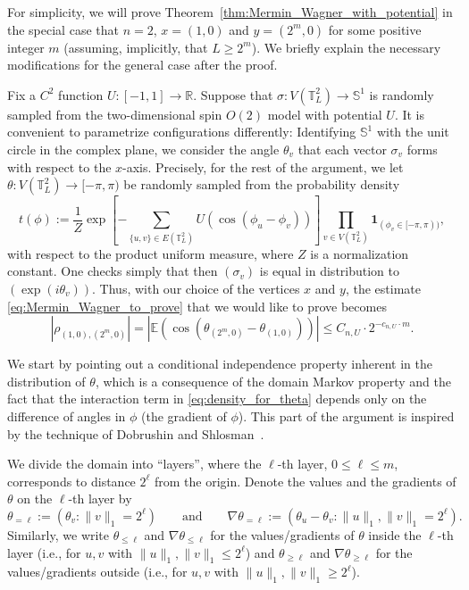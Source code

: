 \documentclass[12pt,reqno]{article}
\def\R{\mathbb{R}}
\def\E{\mathbb{E}}
\def\T{\mathbb{T}}
\def\one{\mathbf{1}}
\begin{document}
For simplicity, we will prove
Theorem~\ref{thm:Mermin_Wagner_with_potential} in the special case
that $n=2$, $x = (1,0)$ and $y = (2^m, 0)$ for some positive integer $m$
(assuming, implicitly, that $L\ge 2^m$). We briefly explain the
necessary modifications for the general case after the proof.

Fix a $C^2$ function $U:[-1,1]\to\R$.
Suppose that $\sigma:V(\T_L^2)\to \mathbb S^1$ is randomly sampled
from the two-dimensional spin $O(2)$ model with potential $U$. It is
convenient to parametrize configurations differently: Identifying
$\mathbb S^1$ with the unit circle in the complex plane, we consider
the angle $\theta_v$ that each vector $\sigma_v$ forms with respect
to the $x$-axis. Precisely, for the rest of the argument, we let
$\theta:V(\T_L^2)\to[-\pi,\pi)$ be randomly sampled from the
probability density
\begin{equation}\label{eq:density_for_theta}
  t(\phi) := \frac{1}{Z}\exp \left[-\sum_{\{u,v\}\in
E(\T_L^2)}U(\cos(\phi_u - \phi_v))\right]
  \prod_{v\in V(\T_L^2)} \one_{(\phi_v\in [-\pi,\pi))},
\end{equation}
with respect to the product uniform measure, where $Z$ is a normalization constant. One checks simply that then
$(\sigma_v)$ is equal in distribution to $(\exp(i\theta_v))$. Thus,
with our choice of the vertices $x$ and $y$, the estimate
\eqref{eq:Mermin_Wagner_to_prove} that we would like to prove
becomes
\begin{equation}\label{eq:correlations_with_theta}
  |\rho_{(1,0),(2^m,0)}| = |\E(\cos(\theta_{(2^m,0)}-\theta_{(1,0)}))| \le C_{n,U}\cdot 2^{-c_{n,U}\cdot m}.
\end{equation}


\medbreak
{} We start by pointing out a conditional independence
property inherent in the distribution of $\theta$, which is a
consequence of the domain Markov property and the fact that the
interaction term in \eqref{eq:density_for_theta} depends only on the
difference of angles in $\phi$ (the gradient of $\phi$). This part
of the argument is inspired by the technique of Dobrushin and
Shlosman~\cite{dobrushin1975absence}.

We divide the domain into ``layers'', where the $\ell$-th layer, $0 \le \ell \le m$, corresponds to distance $2^\ell$ from the origin. Denote the values and the gradients of $\theta$ on the $\ell$-th layer by
\[ \theta_{=\ell} := \left(\theta_v\colon \|v\|_1 = 2^\ell\right) \qquad\text{and}\qquad \nabla\theta_{=\ell} := \left(\theta_u - \theta_v \colon \|u\|_1,\|v\|_1 = 2^\ell\right) .\]
Similarly, we write $\theta_{\le \ell}$ and $\nabla\theta_{\le \ell}$ for the values/gradients of $\theta$ inside the $\ell$-th layer (i.e., for $u,v$ with $\|u\|_1,\|v\|_1 \le 2^\ell$) and $\theta_{\ge\ell}$ and $\nabla\theta_{\ge\ell}$ for the values/gradients outside (i.e., for $u,v$ with $\|u\|_1,\|v\|_1 \ge 2^\ell$).
\end{document}
